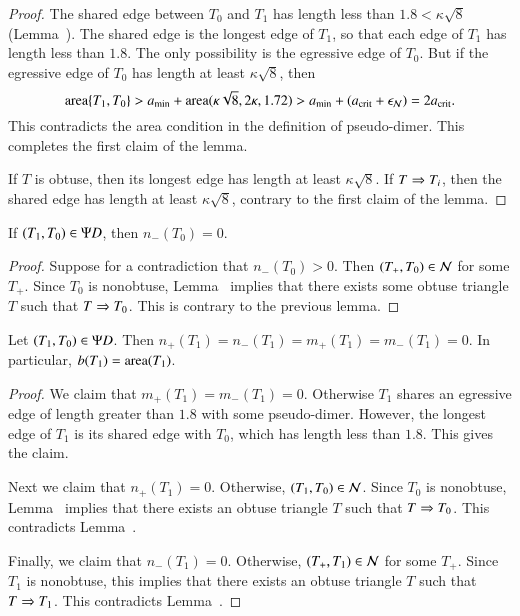 \begin{proof} 
  The shared edge between $T_0$ and $T_1$ has length less than $1.8 <
  \kappa\sqrt8$ (Lemma~).  The shared edge is the
  longest edge of $T_1$, so that each edge of $T_1$ has length less
  than $1.8$.  The only possibility is the egressive edge of $T_0$.
  But if the egressive edge of $T_0$ has length at least
  $\kappa\sqrt8$, then
\[
{\operatorname{area}}\{T_1,T_0\} > a_\text{min} + {\operatorname{area}}(\kappa\sqrt8,2\kappa,1.72) 
> a_\text{min} + (a_\text{crit} + \epsilon_{\mathcal N}) = 2a_\text{crit}.
\]
This contradicts the area condition in the definition of pseudo-dimer.
This completes the first claim of the lemma.

If $T$ is obtuse, then its longest edge has length at least
$\kappa\sqrt8$.  If $T\Rightarrow T_i$, then the shared edge has length at
least $\kappa\sqrt8$, contrary to the first claim of the lemma.
\end{proof}

\begin{corollary}
If $(T_1,T_0)\in\Psi D$, then $n_-(T_0)=0$.
\end{corollary}

\begin{proof} 
  Suppose for a contradiction that $n_-(T_0)>0$.  Then $(T_+,T_0)\in
  \mathcal N$ for some $T_+$.  Since $T_0$ is nonobtuse,
  Lemma~ implies that there exists some
  obtuse triangle $T$ such that $T\Rightarrow T_0$.  This is contrary to the
  previous lemma.
\end{proof}

\begin{lemma} 
  Let $(T_1,T_0)\in\Psi D$.  Then
  $n_+(T_1)=n_-(T_1)=m_+(T_1)=m_-(T_1)=0$.  In particular, $b(T_1) =
  {\operatorname{area}}(T_1)$.
\end{lemma}

\begin{proof}  
  We claim that $m_+(T_1)=m_-(T_1)=0$.  Otherwise $T_1$ shares an
  egressive edge of length greater than $1.8$ with some pseudo-dimer.
  However, the longest edge of $T_1$ is its shared edge with $T_0$,
  which has length less than $1.8$.  This gives the claim.

  Next we claim that $n_+(T_1)=0$.  Otherwise, $(T_1,T_0)\in \mathcal N$.
  Since $T_0$ is nonobtuse, Lemma~ 
  implies that there exists an obtuse
  triangle $T$ such that $T\Rightarrow T_0$.  This contradicts
  Lemma~.

  Finally, we claim that $n_-(T_1)=0$.  Otherwise, $(T_+,T_1)\in \mathcal N$ for
  some $T_+$.  Since $T_1$ is nonobtuse, this implies that there exists
  an obtuse triangle $T$ such that $T\Rightarrow T_1$.  This contradicts
  Lemma~.
\end{proof}

